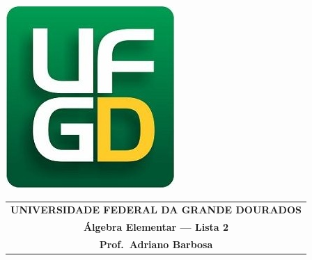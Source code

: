 \documentclass[a4paper,5pt]{amsbook}
\begin{document}
\thispagestyle{empty}
\pagestyle{empty}
\begin{minipage}[h]{0.14\textwidth}
	\includegraphics[scale=0.24]{../ufgd.png}
\end{minipage}
\begin{minipage}[h]{\textwidth}
\begin{tabular}{c}
{{\bf UNIVERSIDADE FEDERAL DA GRANDE DOURADOS}}\\
{{\bf \'Algebra Elementar --- Lista 2}}\\
{{\bf Prof.\ Adriano Barbosa}}\\
\end{tabular}
\vspace{-0.45cm}
%
\end{minipage}

\end{document}
